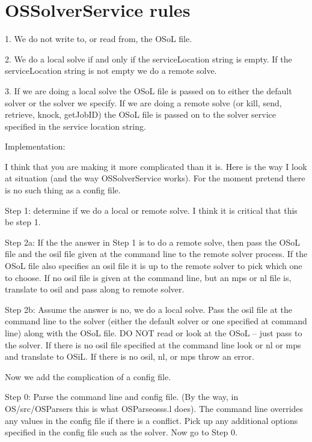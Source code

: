 \section{OSSolverService rules}\label{section:OSSolverServiceRules}


1. We do not write to, or read from, the OSoL file.

2. We do a local solve if and only if the serviceLocation string is empty. If the serviceLocation string is not empty we do a remote solve.

3. If we are doing a local solve the OSoL file is passed on to either the default solver or the solver we specify.  If we are doing a remote solve (or kill, send, retrieve, knock, getJobID)  the OSoL file is passed on to the solver service specified in the service location string. 


Implementation:

I think that you are making it more complicated than it is. Here is the way I look at situation (and the way OSSolverService works).  For the moment pretend there is no such thing as a config file.


Step 1: determine if we do a local or remote solve.  I think it is critical that this be step 1.

Step 2a: If the the answer in Step 1 is to do a remote solve, then pass the OSoL file and the osil file given at the command line to the remote solver process. If the OSoL file also specifies an osil file it is up to the remote solver to pick which one to choose. If no osil file is given at the command line, but an mps or nl file is, translate to osil and pass along to remote solver.

Step 2b: Assume the answer is no, we do a local solve. Pass the osil file at the command line to the solver (either the default solver or one specified at command line) along with the OSoL file. DO NOT read or look at the OSoL -- just pass to the solver. If there is no osil file specified at the command line look or nl or mps and translate to OSiL. If there is no osil, nl, or mps throw an error.


Now we add the complication of a config file.

Step 0: Parse the command line and config file. (By the way, in OS/src/OSParsers this is what  OSParseosss.l does). The command line overrides any values in the config file if there is a conflict. Pick up any additional options specified in the config file such as the solver. Now go to Step 0.
